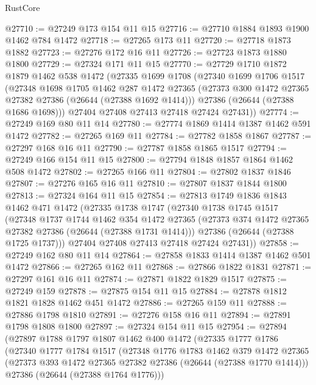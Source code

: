 \begin{lexlean}{RustCore}
\begin{coremodule}
@27710 := @27249 @173 @154 @11 @15
@27716 := @27710 @1884 @1893 @1900 @1462 @784 @1472
@27718 := @27265 @173 @11
@27720 := @27718 @1873 @1882
@27723 := @27276 @172 @16 @11
@27726 := @27723 @1873 @1880 @1800
@27729 := @27324 @171 @11 @15
@27770 := @27729
    @1710
    @1872
    @1879
    @1462
    @538
    @1472
    (@27335
      @1699
      @1708
      (@27340
        @1699
        @1706
        @1517
        (@27348
          @1698
          @1705
          @1462
          @287
          @1472
          @27365
          (@27373 @300 @1472 @27365 @27382 @27386 (@26644 (@27388 @1692 @1414)))
          @27386
          (@26644 (@27388 @1686 @1698)))
        @27404
        @27408
        @27413
        @27418
        @27424
        @27431))
@27774 := @27249 @169 @80 @11 @14
@27780 := @27774 @1869 @1414 @1387 @1462 @591 @1472
@27782 := @27265 @169 @11
@27784 := @27782 @1858 @1867
@27787 := @27297 @168 @16 @11
@27790 := @27787 @1858 @1865 @1517
@27794 := @27249 @166 @154 @11 @15
@27800 := @27794 @1848 @1857 @1864 @1462 @508 @1472
@27802 := @27265 @166 @11
@27804 := @27802 @1837 @1846
@27807 := @27276 @165 @16 @11
@27810 := @27807 @1837 @1844 @1800
@27813 := @27324 @164 @11 @15
@27854 := @27813
    @1749
    @1836
    @1843
    @1462
    @471
    @1472
    (@27335
      @1738
      @1747
      (@27340
        @1738
        @1745
        @1517
        (@27348
          @1737
          @1744
          @1462
          @354
          @1472
          @27365
          (@27373 @374 @1472 @27365 @27382 @27386 (@26644 (@27388 @1731 @1414)))
          @27386
          (@26644 (@27388 @1725 @1737)))
        @27404
        @27408
        @27413
        @27418
        @27424
        @27431))
@27858 := @27249 @162 @80 @11 @14
@27864 := @27858 @1833 @1414 @1387 @1462 @501 @1472
@27866 := @27265 @162 @11
@27868 := @27866 @1822 @1831
@27871 := @27297 @161 @16 @11
@27874 := @27871 @1822 @1829 @1517
@27875 := @27249 @159
@27878 := @27875 @154 @11 @15
@27884 := @27878 @1812 @1821 @1828 @1462 @451 @1472
@27886 := @27265 @159 @11
@27888 := @27886 @1798 @1810
@27891 := @27276 @158 @16 @11
@27894 := @27891 @1798 @1808 @1800
@27897 := @27324 @154 @11 @15
@27954 := @27894
    (@27897
      @1788
      @1797
      @1807
      @1462
      @400
      @1472
      (@27335
        @1777
        @1786
        (@27340
          @1777
          @1784
          @1517
          (@27348
            @1776
            @1783
            @1462
            @379
            @1472
            @27365
            (@27373 @393 @1472 @27365 @27382 @27386 (@26644 (@27388 @1770 @1414)))
            @27386
            (@26644 (@27388 @1764 @1776)))

\end{coremodule}
\end{lexlean}
